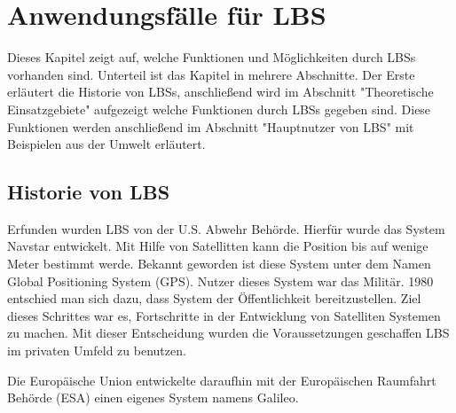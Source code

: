 \section{Anwendungsfälle für LBS}

%
Dieses Kapitel zeigt auf, welche Funktionen und Möglichkeiten durch LBSs vorhanden sind. Unterteil ist das Kapitel in mehrere Abschnitte. Der Erste erläutert die Historie von LBSs, anschließend wird im Abschnitt "Theoretische Einsatzgebiete" aufgezeigt welche Funktionen durch LBSs gegeben sind. Diese Funktionen werden anschließend im Abschnitt "Hauptnutzer von LBS" mit Beispielen aus der Umwelt erläutert.


\subsection{Historie von LBS}
Erfunden wurden LBS von der U.S. Abwehr Behörde. Hierfür wurde das System Navstar entwickelt. Mit Hilfe von Satellitten kann die Position bis auf wenige Meter bestimmt werde. Bekannt geworden ist diese System unter dem Namen Global Positioning System (GPS). Nutzer dieses System war das Militär. 1980 entschied man sich dazu, dass System der Öffentlichkeit bereitzustellen. Ziel dieses Schrittes war es, Fortschritte in der Entwicklung von Satelliten Systemen zu machen. Mit dieser Entscheidung wurden die Voraussetzungen geschaffen LBS im privaten Umfeld zu benutzen.\cite{Navstar} 

Die Europäische Union entwickelte daraufhin mit der Europäischen Raumfahrt Behörde (ESA) einen eigenes System namens Galileo.

